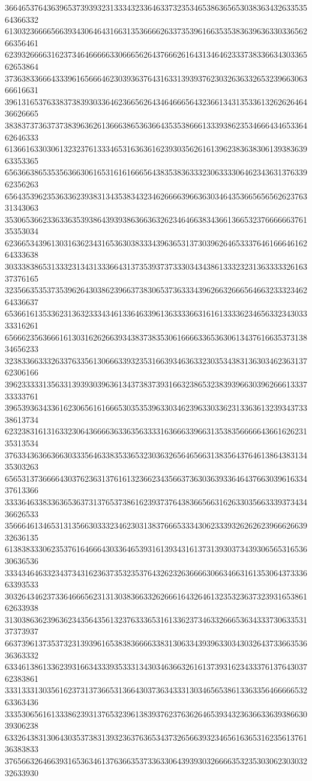 36646537643639653739393231333432336463373235346538636565303836343263353564366332
61303236666566393430646431663135366662633735396166353538363963633033656266356461
62393266663162373464666663306665626437666261643134646233373833663430336562653864
37363833666433396165666462303936376431633139393762303263633265323966306366616631
39613165376338373839303364623665626434646665643236613431353361326262646436626665
38383737363737383963626136663865363664353538666133393862353466643465336462646333
61366163303061323237613334653163636162393035626161396238363830613938363963353365
65636638653535636630616531616166656438353836333230633330646234363137633962356263
65643539623536336239383134353834323462666639663630346435366565656262376331343063
35306536623363363539386439393863663632623464663834366136653237666666376135353034
62366534396130316362343165363038333439636531373039626465333764616664616264333638
30333838653133323134313336643137353937373330343438613332323136333332616337376165
32356635353735396264303862396637383065373633343962663266656466323332346264336637
65366161353362313632333434613364633961363333663161613333623465633234303333316261
65666235636661613031626266393438373835306166663365363061343761663537313834656233
32383366333263376335613066633932353166393463633230353438313630346236313762306166
39623333313563313939303963613437383739316632386532383939663039626661333733333761
39653936343361623065616166653035353963303462396330336231336361323934373338613734
62323831613163323064366663633635633331636663396631353835666664366162623135313534
37633436366366303335646338353365323036326564656631383564376461386438313435303263
65653137366664303762363137616132366234356637363036393364643766303961633437613366
33336463383363653637313765373861623937376438366566316263303566333937343436626533
35666461346531313566303332346230313837666533343062333932626262396662663932636135
61383833306235376164666430336465393161393431613731393037343930656531653630636536
33343464633234373431623637353235376432623263666630663466316135306437333663393533
30326434623733646665623131303836633262666164326461323532363732393165386162633938
31303863623963623435643561323763336531613362373463326665363433373063353137373937
66373961373537323139396165383836666338313063343939633034303264373366353636363332
63346138613362393166343339353331343034636632616137393162343337613764303762383861
33313331303561623731373665313664303736343331303465653861336335646666653263363436
33353065616133386239313765323961383937623763626465393432363663363938663039306238
63326438313064303537383139323637636534373265663932346561636531623561376136383833
37656632646639316536346137636635373363306439393032666635323530306230303232633930

